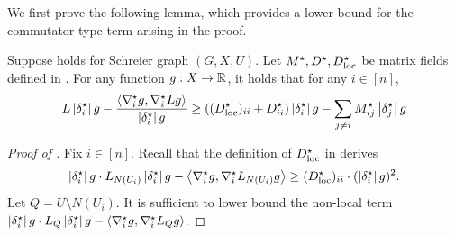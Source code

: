 We first prove the following lemma, which provides a lower bound for the commutator-type term arising in the proof.
\begin{lemma}\label{lem:abs-commutator-Sgraph}
    Suppose  holds for Schreier graph $(G,X,U)$.
    Let $M^\star,D^\star,D^\star_{\-{loc}}$ be matrix fields defined in .
    For any function $g: X \to \R$, it holds that for any $i\in [n]$,
    \begin{align*}
        L \abs{\delta^\star_i} g -  \frac{\inner{\grad_i^\star g}{\grad_i^\star L g}}{\abs{\delta^\star_i} g} \geq ((D^\star_{\-{loc}})_{ii}+D^\star_{ii})\abs{\delta_i^\star} g - \sum_{j\neq i} M^\star_{ij} \abs{\delta_j^\star} g 
    \end{align*}
\end{lemma}
\begin{proof}[Proof of ]
    Fix $i\in [n]$.
    Recall that the definition of $D_{\-{loc}}^\star$ in  derives
    \begin{equation}\label{eq:local_term_Sgraph}
        \abs{\delta_i^\star} g\cdot L_{N(U_i)} \abs{\delta_i^\star} g - \inner{\nabla_i^\star g}{\nabla^\star_i L_{N(U_i)}g} \geq (D_{\-{loc}}^\star)_{ii}\cdot(\abs{\delta_i^\star} g)^2.
    \end{equation}
    Let $Q = U\setminus N(U_i)$.
    It is sufficient to lower bound the non-local term $\abs{\delta_i^\star} g\cdot L_{Q} \abs{\delta_i^\star} g - \inner{\nabla_i^\star g}{\nabla^\star_i L_Qg}$.
    

\end{proof}
